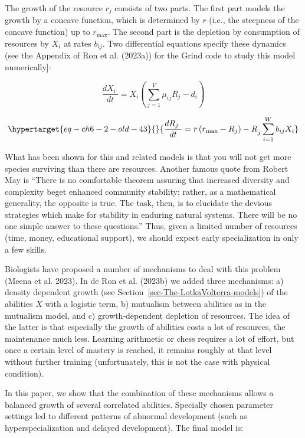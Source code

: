 \documentclass[
  a4paper,
  DIV=11,
  numbers=noendperiod]{scrreprt}
\begin{document}
The growth of the resource \(r_{j}\) consists of two parts. The first
part models the growth by a concave function, which is determined by
\(r\) (i.e., the steepness of the concave function) up to \(r_{\max}\).
The second part is the depletion by consumption of resources by
\(X_{i}\) at rates \(b_{ij}\). Two differential equations specify these
dynamics (see the Appendix of Ron et al. (2023a)) for the Grind code to
study this model numerically{]}:

\[\frac{dX_{i}\ }{dt} = X_{i}(\sum_{j = 1}^{V}{\mu_{ij}R_{j} - d_{i}})\]

\begin{equation}\protect\hypertarget{eq-ch6-2-old-43}{}{
\frac{dR_{j}\ }{dt} = {r\left( r_{\max} - R_{j} \right) - R}_{j}\sum_{i = 1}^{W}{b_{ij}X_{i}}
}\label{eq-ch6-2-old-43}\end{equation}

What has been shown for this and related models is that you will not get
more species surviving than there are resources. Another famous quote
from Robert May is ``There is no comfortable theorem assuring that
increased diversity and complexity beget enhanced community stability;
rather, as a mathematical generality, the opposite is true. The task,
then, is to elucidate the devious strategies which make for stability in
enduring natural systems. There will be no one simple answer to these
questions.'' Thus, given a limited number of resources (time, money,
educational support), we should expect early specialization in only a
few skills.

Biologists have proposed a number of mechanisms to deal with this
problem (Meena et al. 2023). In de Ron et al. (2023b) we added three
mechanisms: a) density dependent growth (see
Section~\ref{sec-The-LotkaVolterra-models}) of the abilities \(X\) with
a logistic term, b) mutualism between abilities as in the mutualism
model, and c) growth-dependent depletion of resources. The idea of the
latter is that especially the growth of abilities costs a lot of
resources, the maintenance much less. Learning arithmetic or chess
requires a lot of effort, but once a certain level of mastery is
reached, it remains roughly at that level without further training
(unfortunately, this is not the case with physical condition).

In this paper, we show that the combination of these mechanisms allows a
balanced growth of several correlated abilities. Specially chosen
parameter settings led to different patterns of abnormal development
(such as hyperspecialization and delayed development). The final model
is:
\end{document}
